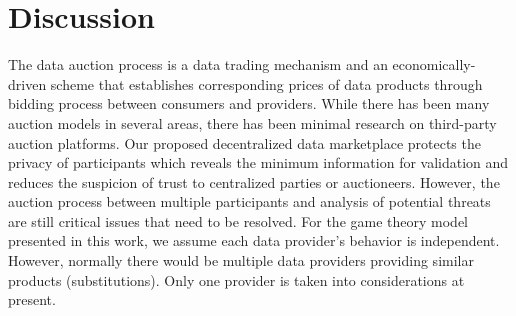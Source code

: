 \documentclass[journal,article,submit,moreauthors,pdftex]{Definitions/mdpi}
\begin{document}


\section{Discussion}

The data auction process is a data trading mechanism and an economically-driven scheme that establishes corresponding prices of data products through bidding process between consumers and providers. While there has been many auction models\cite{BigPicDataMarket} in several areas, there has been minimal research on third-party auction platforms. Our proposed decentralized data marketplace protects the privacy of participants which reveals the minimum information for validation and reduces the suspicion of trust to centralized parties or auctioneers. However, the auction process between multiple participants and analysis of potential threats are still critical issues that need to be resolved. For the game theory model presented in this work, we assume each data provider's behavior is independent. However, normally there would be multiple data providers providing similar products (substitutions). Only one provider is taken into considerations at present.






%
\end{document}

